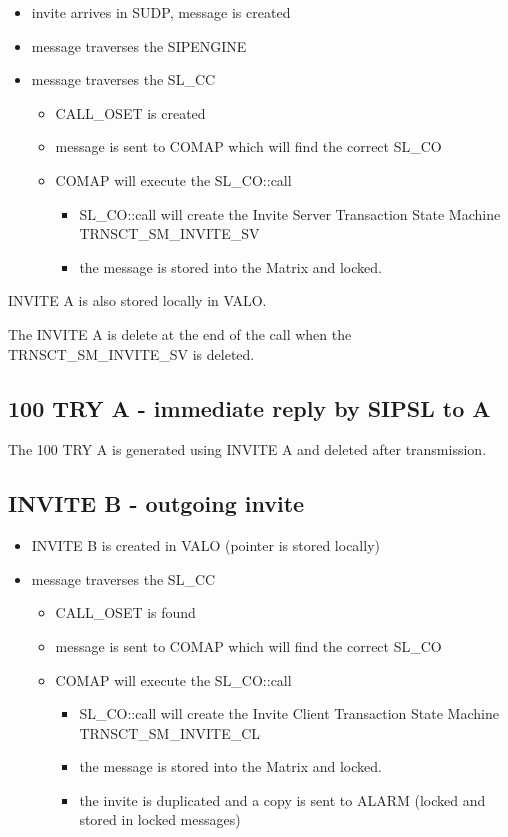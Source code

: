 \documentclass[a4paper]{article}
\begin{document}
\begin {itemize}
\item invite arrives in SUDP, message is created
\item message traverses the SIPENGINE
\item message traverses the SL\_CC
\begin {itemize}
\item CALL\_OSET is created
\item message is sent to COMAP which will find the correct SL\_CO
\item COMAP will execute the SL\_CO::call
\begin {itemize}
\item SL\_CO::call will create the Invite Server Transaction State Machine TRNSCT\_SM\_INVITE\_SV
\item the message is stored into the Matrix and locked.
\end{itemize}
\end{itemize}
\end{itemize}

INVITE A is also stored locally in VALO.

The INVITE A is delete at the end of the call when the TRNSCT\_SM\_INVITE\_SV is deleted.

\subsection{100 TRY A - immediate reply by SIPSL to A}

The 100 TRY A is generated using INVITE A and deleted after transmission.

\subsection{INVITE B - outgoing invite}

\begin {itemize}
\item INVITE B is created in VALO (pointer is stored locally)
\item message traverses the SL\_CC
\begin {itemize}
\item CALL\_OSET is found
\item message is sent to COMAP which will find the correct SL\_CO
\item COMAP will execute the SL\_CO::call
\begin {itemize}
\item SL\_CO::call will create the Invite Client Transaction State Machine TRNSCT\_SM\_INVITE\_CL
\item the message is stored into the Matrix and locked.
\item the invite is duplicated and a copy is sent to ALARM (locked and stored in locked messages)
\end{itemize}
\end{itemize}
\end{itemize}
\end{document}
